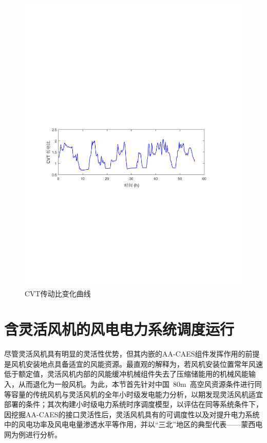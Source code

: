 \begin{figure}[H] %
  \centering
  \includegraphics[scale=0.70]{figures/Chap5-15-CA-WT-Ex-CVT.pdf}
  \caption{CVT传动比变化曲线}
  \label{fig:CA-WT-Ex-CVT}
\end{figure}

\section{含灵活风机的风电电力系统调度运行}
\label{sec:ca-wt-CF-eva}
尽管灵活风机具有明显的灵活性优势，但其内嵌的AA-CAES组件发挥作用的前提是风机安装地点具备适宜的风能资源。最直观的解释为，若风机安装位置常年风速低于额定值，灵活风机内部的风能缓冲机械组件失去了压缩储能用的机械风能输入，从而退化为一般风机。为此，本节首先针对中国~80m~高空风资源条件进行同等容量的传统风机与灵活风机的全年小时级发电能力分析，以期发现灵活风机适宜部署的条件；其次构建小时级电力系统时序调度模型，以评估在同等系统条件下，因挖掘AA-CAES的接口灵活性后，灵活风机具有的可调度性以及对提升电力系统中的风电功率及风电电量渗透水平等作用，并以“三北”地区的典型代表——蒙西电网为例进行分析。

